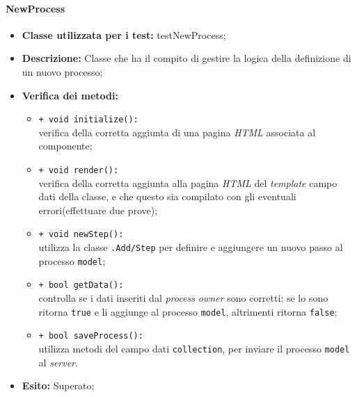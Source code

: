 \paragraph{NewProcess}
\begin{flushleft}
\begin{itemize}
\item \textbf{Classe utilizzata per i test:} testNewProcess;
\item \textbf{Descrizione:} Classe che ha il compito di gestire la logica della definizione di un nuovo processo;
\item \textbf{Verifica dei metodi:}
\begin{sloppypar}
\begin{itemize}
\item \texttt{+ void initialize():}\\ verifica della corretta aggiunta di una pagina \textit{HTML} associata al componente;
\item \texttt{+ void render():}\\ verifica della corretta aggiunta alla pagina \textit{HTML} del \textit{template} campo dati della classe, e che questo sia compilato con gli eventuali errori(effettuare due prove);
\item \texttt{+ void newStep():}\\ utilizza la classe \texttt{\logicAdmin{}.Add\fshyp{}Step} per definire e aggiungere un nuovo passo al processo \texttt{model};
\item \texttt{+ bool getData():}\\ controlla se i dati inseriti dal \textit{process owner} sono corretti: se lo sono ritorna \texttt{true} e li aggiunge al processo \texttt{model}, altrimenti ritorna \texttt{false};
\item \texttt{+ bool saveProcess():}\\ utilizza metodi del campo dati \texttt{collection}, per inviare il processo \texttt{model} al \textit{server}.
\end{itemize}
\end{sloppypar}
\item \textbf{Esito:} Superato;
\end{itemize}
\end{flushleft}

